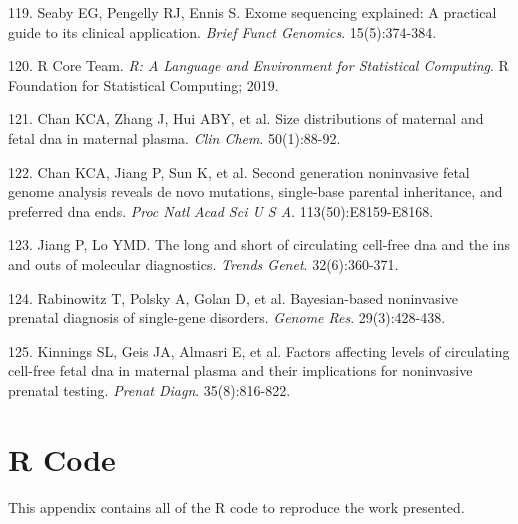 \documentclass[11pt,letterpaper]{book}
\begin{document}
\leavevmode\hypertarget{ref-seaby:2016aa}{}%
119. Seaby EG, Pengelly RJ, Ennis S. Exome sequencing explained: A practical guide to its clinical application. \emph{Brief Funct Genomics}. 15(5):374-384.

\leavevmode\hypertarget{ref-r-core-team:2019aa}{}%
120. R Core Team. \emph{R: A Language and Environment for Statistical Computing}. R Foundation for Statistical Computing; 2019.

\leavevmode\hypertarget{ref-chan:2004aa}{}%
121. Chan KCA, Zhang J, Hui ABY, et al. Size distributions of maternal and fetal dna in maternal plasma. \emph{Clin Chem}. 50(1):88-92.

\leavevmode\hypertarget{ref-chan:2016aa}{}%
122. Chan KCA, Jiang P, Sun K, et al. Second generation noninvasive fetal genome analysis reveals de novo mutations, single-base parental inheritance, and preferred dna ends. \emph{Proc Natl Acad Sci U S A}. 113(50):E8159-E8168.

\leavevmode\hypertarget{ref-jiang:2016ab}{}%
123. Jiang P, Lo YMD. The long and short of circulating cell-free dna and the ins and outs of molecular diagnostics. \emph{Trends Genet}. 32(6):360-371.

\leavevmode\hypertarget{ref-rabinowitz:2019aa}{}%
124. Rabinowitz T, Polsky A, Golan D, et al. Bayesian-based noninvasive prenatal diagnosis of single-gene disorders. \emph{Genome Res}. 29(3):428-438.

\leavevmode\hypertarget{ref-kinnings:2015aa}{}%
125. Kinnings SL, Geis JA, Almasri E, et al. Factors affecting levels of circulating cell-free fetal dna in maternal plasma and their implications for noninvasive prenatal testing. \emph{Prenat Diagn}. 35(8):816-822.

\hypertarget{appendix-appendix}{%
\appendix}


\hypertarget{r-code}{%
\chapter{R Code}\label{r-code}}

This appendix contains all of the R code to reproduce the work presented.
\end{document}
